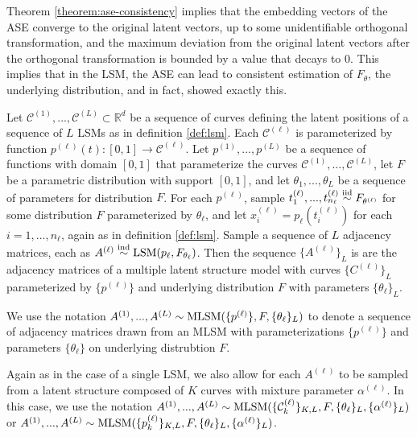 \documentclass[12pt]{article}
\begin{document}
Theorem \ref{theorem:ase-consistency} implies that the embedding vectors
of the ASE converge to the original latent vectors, up to some
unidentifiable orthogonal transformation, and the maximum deviation from
the original latent vectors after the orthogonal transformation is
bounded by a value that decays to \(0\). This implies that in the LSM,
the ASE can lead to consistent estimation of \(F_\theta\), the
underlying distribution, and in fact, \citet{athreya2020estimation}
showed exactly this.

\begin{definition}
\label{def:mlsm}
Let $\mathcal{C}^{(1)}, ..., \mathcal{C}^{(L)} \subset \mathbb{R}^d$ be a sequence of curves defining the latent positions of a sequence of $L$ LSMs as in definition \ref{def:lsm}. 
Each $\mathcal{C}^{(\ell)}$ is parameterized by function $p^{(\ell)}(t) : [0, 1] \to \mathcal{C}^{(\ell)}$. 
Let $p^{(1)}, ..., p^{(L)}$ be a sequence of functions with domain $[0, 1]$ that parameterize the curves $\mathcal{C}^{(1)}, ..., \mathcal{C}^{(L)}$, let $F$ be a parametric distribution with support $[0, 1]$, and let $\theta_1, ..., \theta_L$ be a sequence of parameters for distribution $F$. 
For each $p^{(\ell)}$, sample $t_1^{(\ell)}, ..., t_{n_\ell}^{(\ell)} \stackrel{\mathrm{iid}}{\sim} F_{\theta^{(\ell)}}$ for some distribution $F$ parameterized by $\theta_\ell$, and let $x_i^{(\ell)} = p_\ell(t_i^{(\ell)})$ for each $i = 1, ..., n_\ell$, again as in definition \ref{def:lsm}. 
Sample a sequence of $L$ adjacency matrices, each as $A^{(\ell)} \stackrel{\mathrm{ind}}{\sim} \mathrm{LSM}(p_\ell, F_{\theta_\ell})$. 
Then the sequence $\{A^{(\ell)}\}_L$ is are the adjacency matrices of a multiple latent structure model with curves $\{C^{(\ell)}\}_L$ parameterized by $\{p^{(\ell)}\}$ and underlying distribution $F$ with parameters $\{\theta_\ell\}_L$. 

We use the notation $A^{(1)}, ..., A^{(L)} \sim \mathrm{MLSM}(\{p^{(\ell)}\}, F, \{\theta_\ell\}_L)$ to denote a sequence of adjacency matrices drawn from an MLSM with parameterizations $\{p^{(\ell)}\}$ and parameters $\{\theta_\ell\}$ on underlying distrubtion $F$. 
\end{definition}

\begin{remark}
\label{remark:mlsm-mixture}
Again as in the case of a single LSM, we also allow for each $A^{(\ell)}$ to be sampled from a latent structure composed of $K$ curves with mixture parameter $\alpha^{(\ell)}$. 
In this case, we use the notation $A^{(1)}, ..., A^{(L)} \sim \mathrm{MLSM}(\{\mathcal{C}_k^{(\ell)}\}_{K, L}, F, \{\theta_\ell\}_L, \{\alpha^{(\ell)}\}_L)$ or $A^{(1)}, ..., A^{(L)} \sim \mathrm{MLSM}(\{p_k^{(\ell)}\}_{K, L}, F, \{\theta_\ell\}_L, \{\alpha^{(\ell)}\}_L)$.
\end{remark}
\end{document}
